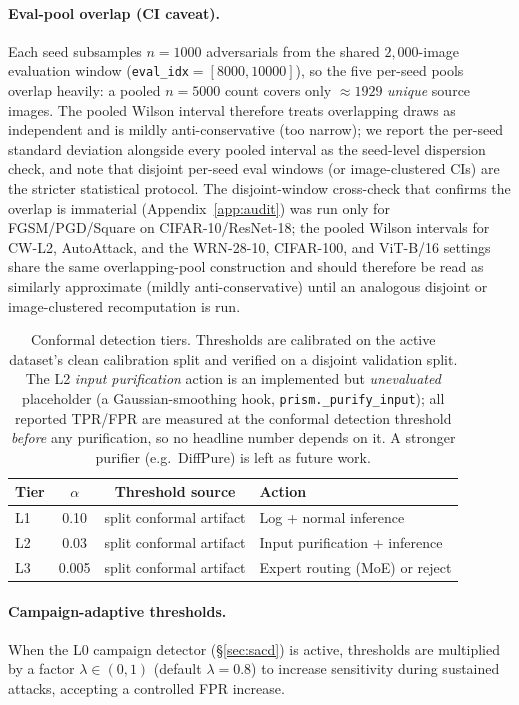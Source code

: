 \paragraph{Eval-pool overlap (CI caveat).} Each seed subsamples
$n{=}1000$ adversarials from the shared $2{,}000$-image evaluation
window (\texttt{eval\_idx}$=[8000,10000]$), so the five per-seed pools
overlap heavily: a pooled $n{=}5000$ count covers only $\approx 1929$
\emph{unique} source images. The pooled Wilson interval therefore treats
overlapping draws as independent and is mildly anti-conservative (too
narrow); we report the per-seed standard deviation alongside every
pooled interval as the seed-level dispersion check, and note that disjoint
per-seed eval windows (or image-clustered CIs) are the stricter statistical
protocol. The disjoint-window cross-check that confirms the
overlap is immaterial (Appendix~\ref{app:audit}) was run only for
FGSM/PGD/Square on CIFAR-10/ResNet-18; the pooled Wilson intervals for
CW-L2, AutoAttack, and the WRN-28-10, CIFAR-100, and ViT-B/16 settings
share the same overlapping-pool construction and should therefore be
read as similarly approximate (mildly anti-conservative) until an
analogous disjoint or image-clustered recomputation is run.

\begin{table}[h]
\centering
\small
\begin{tabular}{lccl}
\toprule
Tier & $\alpha$ & Threshold source & Action \\
\midrule
L1 & 0.10 & split conformal artifact & Log + normal inference \\
L2 & 0.03 & split conformal artifact & Input purification + inference \\
L3 & 0.005 & split conformal artifact & Expert routing (MoE) or reject \\
\bottomrule
\end{tabular}
\caption{Conformal detection tiers. Thresholds are calibrated on the active
dataset's clean calibration split and verified on a disjoint validation split.
The L2 \emph{input purification} action is an implemented but
\emph{unevaluated} placeholder (a Gaussian-smoothing hook,
\texttt{prism.\_purify\_input}); all reported TPR/FPR are measured at the
conformal detection threshold \emph{before} any purification, so no headline
number depends on it. A stronger purifier (e.g.\ DiffPure) is left as future
work.}
\label{tab:tiers}
\end{table}

\paragraph{Campaign-adaptive thresholds.}
When the L0 campaign detector (\S\ref{sec:sacd}) is active, thresholds are 
multiplied by a factor $\lambda \in (0,1)$ (default $\lambda=0.8$) to increase 
sensitivity during sustained attacks, accepting a controlled FPR increase.

